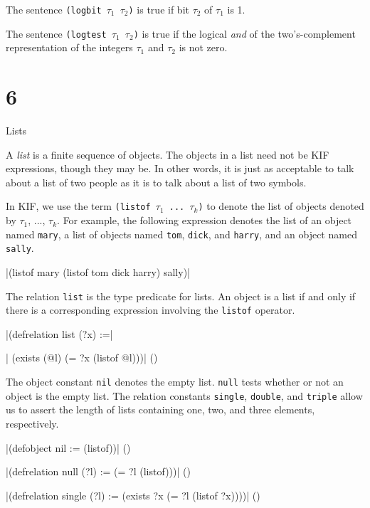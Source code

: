 {The sentence {\tt (logbit $\tau_1$ $\tau_2$)} is true if bit $\tau_2$
of $\tau_1$ is 1.}

{The sentence {\tt (logtest $\tau_1$ $\tau_2$)} is true if the logical
{\it and} of the two's-complement representation of the integers
$\tau_1$ and $\tau_2$ is not zero.}

\vfill\eject

\chapter{6}{Lists}

A {\it list} is a finite sequence of objects.  The objects in a
list need not be KIF expressions, though they may be. 
In other words, it is just as acceptable to talk about a list of
two people as it is to talk about a list of two symbols.

In KIF, we use the term {\tt (listof $\tau_1$ ... $\tau_k$)} to denote the
list of objects denoted by $\tau_1$, ..., $\tau_k$.  For example, the
following expression denotes the list of an object named {\tt mary}, a list of
objects named {\tt tom}, {\tt dick}, and {\tt harry}, and an object named
{\tt sally}.

\medskip
\verbatim|(listof mary (listof tom dick harry) sally)|
\medskip

The relation {\tt list} is the type predicate for lists.  An object is a list
if and only if there is a corresponding expression involving the {\tt listof}
operator.

\medskip
\verbatim|(defrelation list (?x) :=|\par
\verbatim|  (exists (@l) (= ?x (listof @l)))|
\hfill(\equation)\par
\medskip

The object constant {\tt nil} denotes the empty list.  {\tt null} tests whether
or not an object is the empty list.  The relation constants {\tt single},
{\tt double}, and {\tt triple} allow us to assert the length of lists
containing one, two, and three elements, respectively.

\medskip
\verbatim|(defobject nil := (listof))|
\hfill(\equation)\par
\medskip

\medskip
\verbatim|(defrelation null (?l) := (= ?l (listof)))|
\hfill(\equation)\par
\medskip

\medskip
\verbatim|(defrelation single (?l) := (exists ?x (= ?l (listof ?x))))|
\hfill(\equation)\par
\medskip

